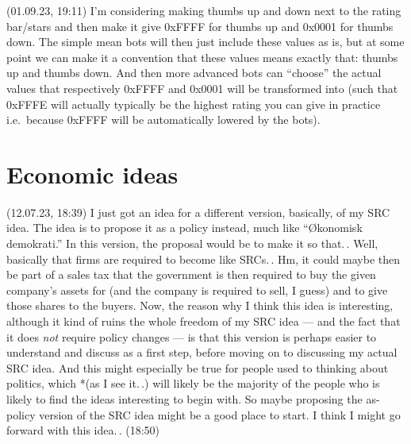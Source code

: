 \documentclass{report}
\begin{document}



(01.09.23, 19:11) I'm considering making thumbs up and down next to the rating bar/stars and then make it give 0xFFFF for thumbs up and 0x0001 for thumbs down. The simple mean bots will then just include these values as is, but at some point we can make it a convention that these values means exactly that: thumbs up and thumbs down. And then more advanced bots can ``choose'' the actual values that respectively 0xFFFF and 0x0001 will be transformed into (such that 0xFFFE will actually typically be the highest rating you can give in practice i.e.\ because 0xFFFF will be automatically lowered by the bots).












\chapter{Economic ideas}

(12.07.23, 18:39) I just got an idea for a different version, basically, of my SRC idea. The idea is to propose it as a policy instead, much like ``Økonomisk demokrati.'' In this version, the proposal would be to make it so that.\,. Well, basically that firms are required to become like SRCs.\,. Hm, it could maybe then be part of a sales tax that the government is then required to buy the given company's assets for (and the company is required to sell, I guess) and to give those shares to the buyers. Now, the reason why I think this idea is interesting, although it kind of ruins the whole freedom of my SRC idea --- and the fact that it does \emph{not} require policy changes --- is that this version is perhaps easier to understand and discuss as a first step, before moving on to discussing my actual SRC idea. And this might especially be true for people used to thinking about politics, which *(as I see it.\,.) will likely be the majority of the people who is likely to find the ideas interesting to begin with. So maybe proposing the as-policy version of the SRC idea might be a good place to start. I think I might go forward with this idea.\,. (18:50)
\end{document}
